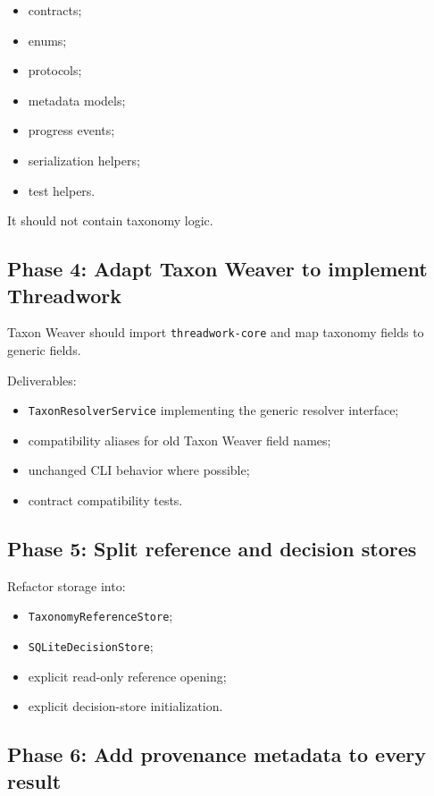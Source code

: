 \documentclass[11pt,a4paper]{article}
\newcommand{\code}[1]{\texttt{#1}}
\begin{document}
\begin{itemize}
  \item contracts;
  \item enums;
  \item protocols;
  \item metadata models;
  \item progress events;
  \item serialization helpers;
  \item test helpers.
\end{itemize}

It should not contain taxonomy logic.

\subsection{Phase 4: Adapt Taxon Weaver to implement Threadwork}

Taxon Weaver should import \code{threadwork-core} and map taxonomy fields to generic fields.

Deliverables:

\begin{itemize}
  \item \code{TaxonResolverService} implementing the generic resolver interface;
  \item compatibility aliases for old Taxon Weaver field names;
  \item unchanged CLI behavior where possible;
  \item contract compatibility tests.
\end{itemize}

\subsection{Phase 5: Split reference and decision stores}

Refactor storage into:

\begin{itemize}
  \item \code{TaxonomyReferenceStore};
  \item \code{SQLiteDecisionStore};
  \item explicit read-only reference opening;
  \item explicit decision-store initialization.
\end{itemize}

\subsection{Phase 6: Add provenance metadata to every result}
\end{document}
